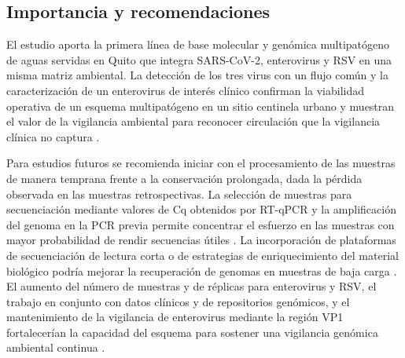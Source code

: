 \subsection{Importancia y recomendaciones}

El estudio aporta la primera línea de base molecular y genómica multipatógeno de aguas servidas en Quito que integra SARS-CoV-2, enterovirus y RSV en una misma matriz ambiental. La detección de los tres virus con un flujo común y la caracterización de un enterovirus de interés clínico confirman la viabilidad operativa de un esquema multipatógeno en un sitio centinela urbano y muestran el valor de la vigilancia ambiental para reconocer circulación que la vigilancia clínica no captura \cite{Bubba_2023,Asghar_2014,Parkins_2023}.

Para estudios futuros se recomienda iniciar con el procesamiento de las muestras de manera temprana frente a la conservación prolongada, dada la pérdida observada en las muestras retrospectivas. La selección de muestras para secuenciación mediante valores de Cq obtenidos por RT-qPCR y la amplificación del genoma en la PCR previa permite concentrar el esfuerzo en las muestras con mayor probabilidad de rendir secuencias útiles \cite{MejiaCalle_2024,Parkins_2023}. La incorporación de plataformas de secuenciación de lectura corta o de estrategias de enriquecimiento del material biológico podría mejorar la recuperación de genomas en muestras de baja carga \cite{Child_2023}. El aumento del número de muestras y de réplicas para enterovirus y RSV, el trabajo en conjunto con datos clínicos y de repositorios genómicos, y el mantenimiento de la vigilancia de enterovirus mediante la región VP1 fortalecerían la capacidad del esquema para sostener una vigilancia genómica ambiental continua \cite{Le_2025,Bruno_2025,Klapsa_2022}.
